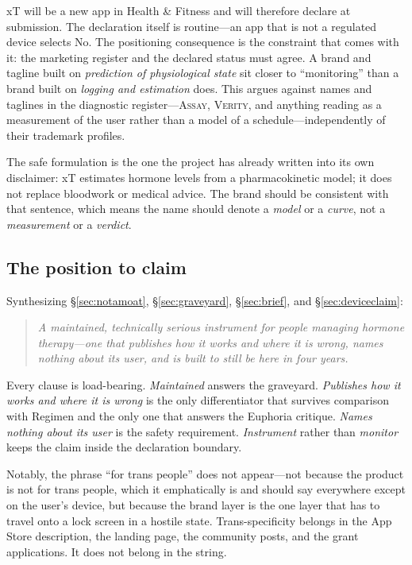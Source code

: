 \documentclass[11pt,a4paper]{article}
\newcommand{\name}[1]{\textsc{#1}}
\begin{document}
xT will be a new app in Health \& Fitness and will therefore declare at
submission. The declaration itself is routine---an app that is not a
regulated device selects No. The positioning consequence is the
constraint that comes with it: the marketing register and the declared
status must agree. A brand and tagline built on \emph{prediction of
physiological state} sit closer to ``monitoring'' than a brand built on
\emph{logging and estimation} does. This argues against names and
taglines in the diagnostic register---\name{Assay}, \name{Verity}, and
anything reading as a measurement of the user rather than a model of a
schedule---independently of their trademark profiles.

The safe formulation is the one the project has already written into
its own disclaimer: xT estimates hormone levels from a pharmacokinetic
model; it does not replace bloodwork or medical advice. The brand
should be consistent with that sentence, which means the name should
denote a \emph{model} or a \emph{curve}, not a \emph{measurement} or a
\emph{verdict}.

\subsection{The position to claim}

Synthesizing \S\ref{sec:notamoat}, \S\ref{sec:graveyard},
\S\ref{sec:brief}, and \S\ref{sec:deviceclaim}:

\begin{quote}
\emph{A maintained, technically serious instrument for people managing
hormone therapy---one that publishes how it works and where it is
wrong, names nothing about its user, and is built to still be here in
four years.}
\end{quote}

Every clause is load-bearing. \emph{Maintained} answers the graveyard.
\emph{Publishes how it works and where it is wrong} is the only
differentiator that survives comparison with Regimen and the only one
that answers the Euphoria critique. \emph{Names nothing about its user}
is the safety requirement. \emph{Instrument} rather than \emph{monitor}
keeps the claim inside the declaration boundary.

Notably, the phrase ``for trans people'' does not appear---not because
the product is not for trans people, which it emphatically is and
should say everywhere except on the user's device, but because the
brand layer is the one layer that has to travel onto a lock screen in a
hostile state. Trans-specificity belongs in the App Store description,
the landing page, the community posts, and the grant applications. It
does not belong in the string.
\end{document}
